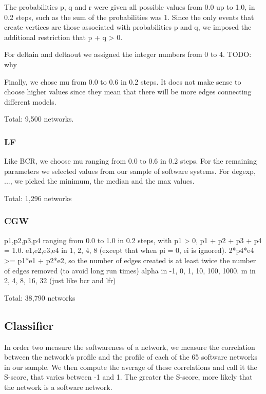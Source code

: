 
The probabilities p, q and r were given all possible values from 0.0 up to 1.0,
in 0.2 steps, such as the sum of the probabilities was 1. Since the only events
that create vertices are those associated with probabilities p and q, we imposed
the additional restriction that p + q > 0.

For deltain and deltaout we assigned the integer numbers from 0 to 4. TODO: why

Finally, we chose mu from 0.0 to 0.6 in 0.2 steps. It does not make sense to
choose higher values since they mean that there will be more edges connecting
different models.

Total: 9,500 networks.

\subsubsection{LF}

Like BCR, we choose mu ranging from 0.0 to 0.6 in 0.2 steps. For the remaining
parameters we selected values from our sample of software systems. For degexp,
..., we picked the minimum, the median and the max values.

Total: 1,296 networks

\subsubsection{CGW}

p1,p2,p3,p4 ranging from 0.0 to 1.0 in 0.2 steps, with p1 > 0, p1 + p2 + p3 + p4 = 1.0.
e1,e2,e3,e4 in 1, 2, 4, 8 (except that when pi = 0, ei is ignored).
2*p4*e4 >= p1*e1 + p2*e2, so the number of edges created is at least twice
the number of edges removed (to avoid long run times)
alpha in -1, 0, 1, 10, 100, 1000. 
m in 2, 4, 8, 16, 32 (just like bcr and lfr)

Total: 38,790 networks

\subsection{Classifier} %


In order two measure the softwareness of a network, we measure the correlation
between the network's profile and the profile of each of the 65 software
networks in our sample. We then compute the average of these correlations and
call it the S-score, that varies between -1 and 1. The greater the S-score, more
likely that the network is a software network.

